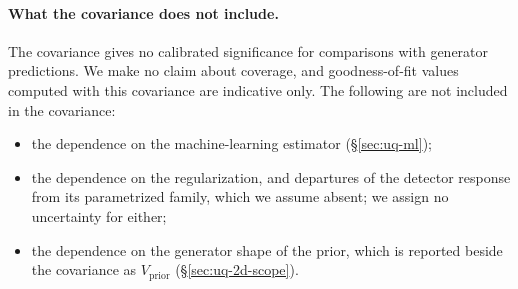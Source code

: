 \paragraph{What the covariance does not include.} The covariance gives no calibrated significance for comparisons with generator predictions. We make no claim about coverage, and goodness-of-fit values computed with this covariance are indicative only. The following are not included in the covariance:
\begin{itemize}[nosep]
  \item the dependence on the machine-learning estimator (\S\ref{sec:uq-ml});
  \item the dependence on the regularization, and departures of the detector response from its parametrized family, which we assume absent; we assign no uncertainty for either;
  \item the dependence on the generator shape of the prior, which is reported beside the covariance as $V_{\mathrm{prior}}$ (\S\ref{sec:uq-2d-scope}).
\end{itemize}
